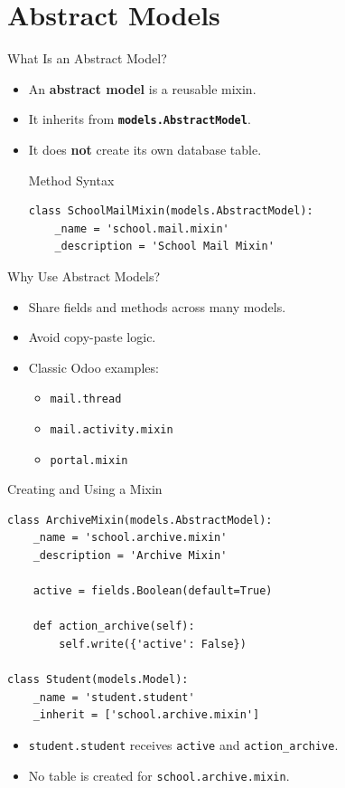\section{Abstract Models}

\begin{frame}[fragile]{What Is an Abstract Model?}
	\begin{itemize}
		\item An \textbf{abstract model} is a reusable mixin.
		\item It inherits from \textbf{\texttt{models.AbstractModel}}.
		\item It does \textbf{not} create its own database table.
\begin{block}{Method Syntax}
\begin{lstlisting}
class SchoolMailMixin(models.AbstractModel):
	_name = 'school.mail.mixin'
	_description = 'School Mail Mixin'
\end{lstlisting}
\end{block}
	\end{itemize}
\end{frame}

\begin{frame}[fragile]{Why Use Abstract Models?}
	\begin{itemize}
		\item Share fields and methods across many models.
		\item Avoid copy-paste logic.
		\item Classic Odoo examples:
		\begin{itemize}
			\item \texttt{mail.thread}
			\item \texttt{mail.activity.mixin}
			\item \texttt{portal.mixin}
		\end{itemize}
	\end{itemize}
\end{frame}

\begin{frame}[fragile]{Creating and Using a Mixin}
\begin{lstlisting}
class ArchiveMixin(models.AbstractModel):
	_name = 'school.archive.mixin'
	_description = 'Archive Mixin'

	active = fields.Boolean(default=True)

	def action_archive(self):
		self.write({'active': False})

class Student(models.Model):
	_name = 'student.student'
	_inherit = ['school.archive.mixin']
\end{lstlisting}
	\begin{itemize}
		\item \texttt{student.student} receives \texttt{active} and \texttt{action\_archive}.
		\item No table is created for \texttt{school.archive.mixin}.
	\end{itemize}
\end{frame}

